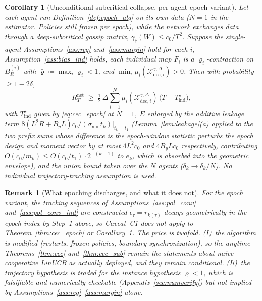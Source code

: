 \documentclass[11pt]{article}
\newtheorem{corollary}[theorem]{Corollary}
\newtheorem{remark}[theorem]{Remark}
\begin{document}
\begin{corollary}[Unconditional subcritical collapse, per-agent epoch
variant]\label{cor:epoch_sub}
Let each agent run Definition~\ref{def:epoch_alg} on its \emph{own}
data ($N=1$ in the estimator. Policies still frozen per epoch), while
the network exchanges data through a deep-subcritical gossip matrix,
$\gamma_\dagger(W)\leq c_0/T^2$.  Suppose the single-agent
Assumptions~\ref{ass:reg} and~\ref{ass:margin} hold for each $i$,
Assumption~\ref{ass:bias_ind} holds, each individual map $F_i$ is a
$\varrho_i$-contraction on $B_R^{(i)}$ with
$\bar\varrho\coloneqq\max_i\varrho_i<1$, and
$\min_i\mu_i(\mathcal X_{\mathrm{dec},i}^{\gamma,\Delta})>0$.  Then
with probability $\geq 1-2\delta$,
\[
R_T^{\mathrm{net}}\;\geq\;\tfrac12\,\Delta\sum_{i=1}^N
\mu_i(\mathcal X_{\mathrm{dec},i}^{\gamma,\Delta})\,
\bigl(T-T^\star_{\mathrm{ind}}\bigr),
\]
with $T^\star_{\mathrm{ind}}$ given by \eqref{eq:cec_epoch} at $N=1$,
$\bar E$ enlarged by the additive leakage term
$8(L^2R+B_yL)c_0/(\sigma_{\min}t_k)\big|_{t_k=t_1}$
(Lemma~\ref{lem:leakage}(a) applied to the two prefix sums whose
difference is the epoch-window statistic perturbs the epoch design and
moment vector by at most $4L^2c_0$ and $4B_yLc_0$ respectively,
contributing
$O(c_0/m_k)\leq O(c_0/t_1)\cdot 2^{-(k-1)}$ to $e_k$, which is
absorbed into the geometric envelope), and the union bound taken over
the $N$ agents ($\delta_k\to\delta_k/N$).  No individual
trajectory-tracking assumption is used.
\end{corollary}

\begin{remark}[What epoching discharges, and what it does not]
\label{rem:epoch_scope}
For the epoch variant, the tracking sequences of
Assumptions~\ref{ass:pol_conv} and~\ref{ass:pol_conv_ind} are
\emph{constructed} $\epsilon_\tau=r_{k(\tau)}$ decays geometrically
in the epoch index by Step~1 above, so Caveat~C1 does not apply to
Theorem~\ref{thm:cec_epoch} or Corollary~\ref{cor:epoch_sub}.  The
price is twofold. (I)~the algorithm is modified (restarts, frozen
policies, boundary synchronization), so the anytime
Theorems~\ref{thm:cec} and~\ref{thm:cec_sub} remain the statements
about naive cooperative LinUCB as actually deployed, and they remain
conditional. (Ii)~the trajectory hypothesis is traded for the
\emph{instance} hypothesis $\varrho<1$, which is falsifiable and
numerically checkable (Appendix~\ref{sec:numverify}) but not implied
by Assumptions~\ref{ass:reg}--\ref{ass:margin} alone.
\end{remark}
\end{document}
